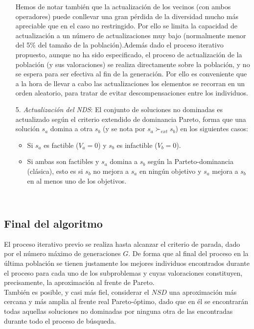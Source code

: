 \begin{enumerate}
      Hemos de notar también que la actualización de los vecinos (con ambos operadores) puede conllevar una gran pérdida de la diversidad mucho más apreciable que en el caso no restringido. Por ello se limita la capacidad de actualización a un número de actualizaciones muy bajo (normalmente menor del 5\% del tamaño de la población).Además dado el proceso iterativo propuesto, aunque no ha sido especificado, el proceso de actualización de la población (y sus valoraciones) se realiza directamente sobre la población, y no se espera para ser efectiva al fin de la generación. Por ello es conveniente que a la hora de llevar a cabo las actualizaciones los elementos se recorran en un orden aleatorio, para tratar de evitar descompensaciones entre los individuos.\\
      
       \item[5.] \textit{Actualización del \textit{NDS}}: El conjunto de soluciones no dominadas es actualizado según el criterio extendido de dominancia Pareto, forma que una solución $s_a$ domina a otra $s_b$ (y se nota por $s_a \succ_{ext} s_b$) en los siguientes casos:\\ 
       \begin{itemize}
       		\item Si $s_a$ es factible ($V_a=0$) y $s_b$ es infactible ($V_b=0$).\\
       		\item Si ambas son factibles y $s_a$ domina a $s_b$ según la Parteto-dominancia (clásica), esto es si $s_b$ no mejora a $s_a$ en ningún objetivo y $s_a$ mejora a $s_b$ en al menos uno de los objetivos.\\
       \end{itemize}\
\end{enumerate}

\subsection{Final del algoritmo}

\justify

El proceso iterativo previo se realiza hasta alcanzar el criterio de parada, dado por el número máximo de generaciones $G$. De forma que al final del proceso en la última población se tienen justamente los mejores individuos encontrados durante el proceso para cada uno de los subproblemas y cuyas valoraciones constituyen, precisamente, la aproximación al frente de Pareto. \\

También es posible, y casi más fiel, considerar el $NSD$ una aproximación más cercana y más amplia al frente real Pareto-óptimo, dado que en él se encontrarán todas aquellas soluciones no dominadas por ninguna otra de las encontradas durante todo el proceso de búsqueda.\\ 


